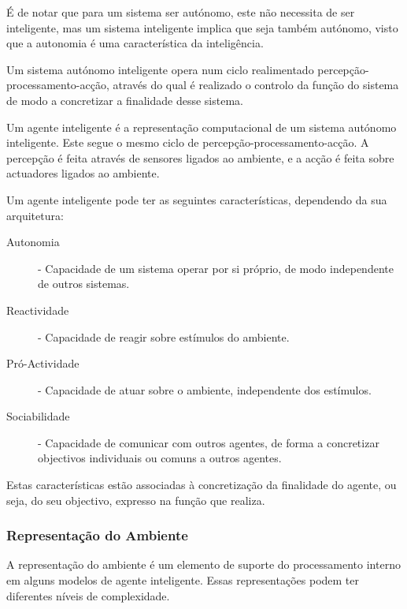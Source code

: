 \documentclass[a4paper,12pt]{article}
\begin{document}
É de notar que para um sistema ser autónomo, este não necessita de ser inteligente, mas um sistema inteligente implica que seja também autónomo, visto que a autonomia é uma característica da inteligência.

Um sistema autónomo inteligente opera num ciclo realimentado percepção-processamento-acção, através do qual é realizado o controlo da função do sistema de modo a concretizar a finalidade desse sistema.

Um agente inteligente é a representação computacional de um sistema autónomo inteligente. Este segue o mesmo ciclo de percepção-processamento-acção. A percepção é feita através de sensores ligados ao ambiente, e a acção é feita sobre actuadores ligados ao ambiente.

Um agente inteligente pode ter as seguintes características, dependendo da sua arquitetura:
\begin{description}
	\item[Autonomia] - Capacidade de um sistema operar por si próprio, de modo independente de outros sistemas.
	\item[Reactividade] - Capacidade de reagir sobre estímulos do ambiente.
	\item[Pró-Actividade] - Capacidade de atuar sobre o ambiente, independente dos estímulos.
	\item[Sociabilidade] - Capacidade de comunicar com outros agentes, de forma a concretizar objectivos individuais ou comuns a outros agentes.
\end{description}
Estas características estão associadas à concretização da finalidade do agente, ou seja, do seu objectivo, expresso na função que realiza.

\subsubsection{Representação do Ambiente} \label{representacao_do_ambiente}
A representação do ambiente é um elemento de suporte do processamento interno em alguns modelos de agente inteligente.
Essas representações podem ter diferentes níveis de complexidade.
\end{document}
